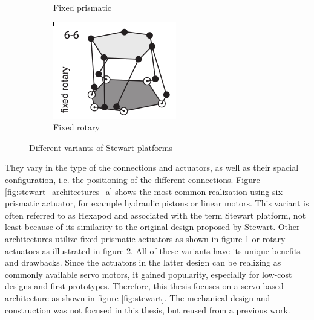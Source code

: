 \begin{figure}
\begin{subfigure}{0.3\textwidth}
		\caption{Fixed prismatic}
		\label{fig:stewart_architectures_b}
	\end{subfigure}
	\begin{subfigure}{0.3\textwidth}
		\centering
		\includegraphics[width=\textwidth]{../figures/stewart_architectures_e}
		\caption{Fixed rotary}
		\label{fig:stewart_architectures_c}
	\end{subfigure}
	\caption{Different variants of Stewart platforms \citep[adopted from][]{Szu13}}
	\label{fig:stewart_architectures}
\end{figure}
They vary in the type of the connections and actuators, as well as their
spacial configuration, i.e. the positioning of the different connections.
Figure \ref{fig:stewart_architectures_a} shows the most common realization
using six prismatic actuator, for example hydraulic pistons or linear motors.
This variant is often referred to as Hexapod and associated with the term
Stewart platform, not least because of its similarity to the original design
proposed by Stewart. Other architectures utilize fixed prismatic actuators as
shown in figure \ref{fig:stewart_architectures_b} or rotary actuators as
illustrated in figure \ref{fig:stewart_architectures_c}. All of these variants
have its unique benefits and drawbacks. Since the actuators in the latter
design can be realizing as commonly available servo motors, it gained
popularity, especially for low-cost designs and first prototypes. Therefore,
this thesis focuses on a servo-based architecture as shown in figure
\ref{fig:stewart}. The mechanical design and construction was not focused in
this thesis, but reused from a previous work.
